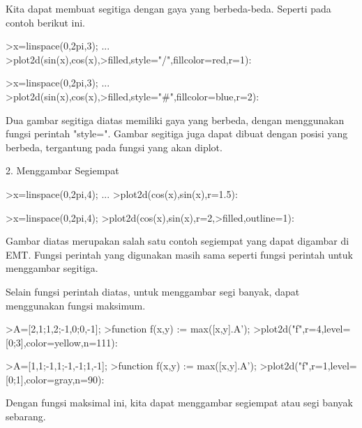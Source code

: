 \documentclass[a4paper,10pt]{article}
\begin{document}
\begin{eulernotebook}
\begin{eulercomment}
\begin{eulercomment}
\begin{eulercomment}
\begin{eulercomment}
\begin{eulercomment}
\begin{eulercomment}
\begin{eulercomment}
\begin{eulercomment}
\begin{eulercomment}
Kita dapat membuat segitiga dengan gaya yang berbeda-beda. Seperti
pada contoh berikut ini.
\end{eulercomment}
\begin{eulerprompt}
>x=linspace(0,2pi,3); ...
>plot2d(sin(x),cos(x),>filled,style="/",fillcolor=red,r=1):
\end{eulerprompt}
\begin{eulerprompt}
>x=linspace(0,2pi,3); ...
>plot2d(sin(x),cos(x),>filled,style="#",fillcolor=blue,r=2):
\end{eulerprompt}
\begin{eulercomment}
Dua gambar segitiga diatas memiliki gaya yang berbeda, dengan
menggunakan fungsi perintah "style=". Gambar segitiga juga dapat
dibuat dengan posisi yang berbeda, tergantung pada fungsi yang akan
diplot.


2. Menggambar Segiempat
\end{eulercomment}
\begin{eulerprompt}
>x=linspace(0,2pi,4); ...
>plot2d(cos(x),sin(x),r=1.5):
\end{eulerprompt}
\begin{eulerprompt}
>x=linspace(0,2pi,4); 
>plot2d(cos(x),sin(x),r=2,>filled,outline=1):
\end{eulerprompt}
\begin{eulercomment}
Gambar diatas merupakan salah satu contoh segiempat yang dapat
digambar di EMT. Fungsi perintah yang digunakan masih sama seperti
fungsi perintah untuk menggambar segitiga. 

Selain fungsi perintah diatas, untuk menggambar segi banyak, dapat
menggunakan fungsi maksimum.
\end{eulercomment}
\begin{eulerprompt}
>A=[2,1;1,2;-1,0;0,-1];
>function f(x,y) := max([x,y].A');
>plot2d("f",r=4,level=[0;3],color=yellow,n=111):
\end{eulerprompt}
\begin{eulerprompt}
>A=[1,1;-1,1;-1,-1;1,-1];
>function f(x,y) := max([x,y].A');
>plot2d("f",r=1,level=[0;1],color=gray,n=90):
\end{eulerprompt}
\begin{eulercomment}
Dengan fungsi maksimal ini, kita dapat menggambar segiempat atau segi
banyak sebarang.



\end{eulercomment}
\end{eulercomment}
\end{eulercomment}
\end{eulercomment}
\end{eulercomment}
\end{eulercomment}
\end{eulercomment}
\end{eulercomment}
\end{eulercomment}
\end{eulernotebook}
\end{document}
